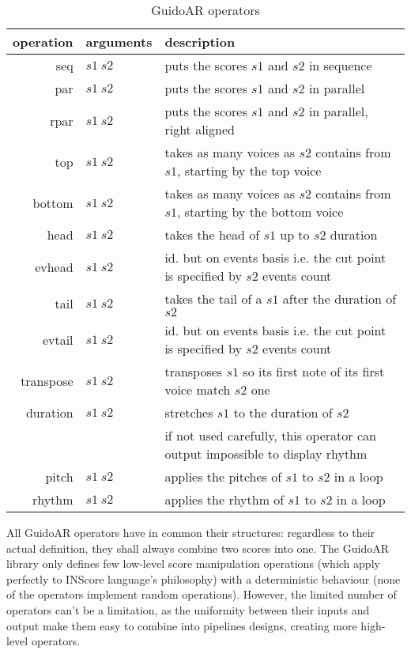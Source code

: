 \documentclass{article}
\begin{document}
\begin{table*}[htdp]
\begin{center}
\begin{tabular}{rll}
\hline
operation & arguments		&	description \\
\hline
seq 	&	$s1\ s2$		& puts the scores $s1$ and $s2$ in sequence \\
par 	&	$s1\ s2$		& puts the scores $s1$ and $s2$ in parallel \\ 
rpar	&	$s1\ s2$		& puts the scores $s1$ and $s2$ in parallel, right aligned \\
top 	&	$s1\ s2$ 	& takes as many voices as $s2$ contains from $s1$, starting by the top voice \\
bottom 	&	$s1\ s2$ 	& takes as many voices as $s2$ contains from $s1$, starting by the bottom voice  \\
head	& 	$s1\ s2$	& takes the head of $s1$ up to $s2$ duration \\
evhead 	&	$s1\ s2$	& id. but on events basis i.e. the cut point is specified by $s2$ events count \\
tail	&	$s1\ s2$ 	& takes the tail of a $s1$ after the duration of $s2$ \\
evtail 	&	$s1\ s2$ 	& id. but on events basis i.e. the cut point is specified by $s2$ events count \\
transpose 	&	$s1\ s2$	& transposes $s1$ so its first note of its first voice match $s2$ one \\
duration 	&	$s1\ s2$	& stretches $s1$ to the duration of $s2$  \\
			& 	& if not used carefully, this operator can output impossible to display rhythm\\
pitch 	&	$s1\ s2$	& applies the pitches of $s1$ to $s2$ in a loop \\
rhythm 	&	$s1\ s2$	& applies the rhythm of $s1$ to $s2$ in a loop \\
\hline
\end{tabular}
\end{center}

\caption{GuidoAR operators}
\label{operations}
\end{table*}

All GuidoAR operators have in common their structures: regardless to their actual definition, they shall always combine two scores into one. The GuidoAR library only defines few low-level score manipulation operations  (which apply perfectly to INScore language's philosophy) with a deterministic behaviour (none of the operators implement random operations). However, the limited number of operators can't be a limitation, as the uniformity between their inputs and output make them easy to combine into pipelines designs, creating more high-level operators.
\end{document}
